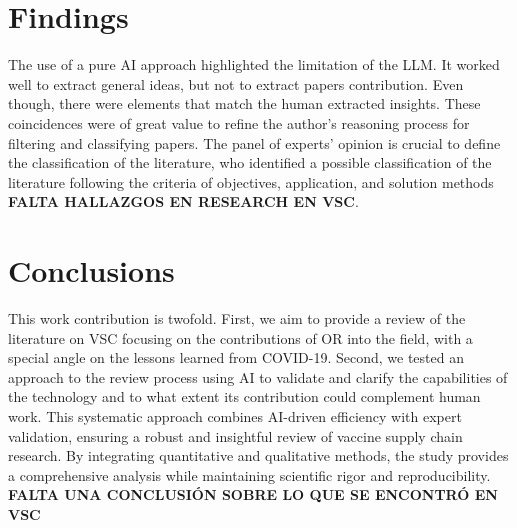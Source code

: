 \documentclass{optica-article}
\begin{document}
\section{Findings}

The use of a pure AI approach highlighted the limitation of the LLM. It worked well to extract general ideas, but not to extract papers contribution. Even though, there were elements that match the human extracted insights. These coincidences were of great value to refine the author's reasoning process for filtering and classifying papers. The panel of experts’ opinion is crucial to define the classification of the literature, who identified a possible classification of the literature following the criteria of objectives, application, and solution methods \textbf{FALTA HALLAZGOS EN RESEARCH EN VSC}.

\section{Conclusions}

This work contribution is twofold. First, we aim to provide a review of the literature on VSC focusing on the contributions of OR into the field, with a special angle on the lessons learned from COVID-19. Second, we tested an approach to the review process using AI to validate and clarify the capabilities of the technology and to what extent its contribution could complement human work. This systematic approach combines AI-driven efficiency with expert validation, ensuring a robust and insightful review of vaccine supply chain research. By integrating quantitative and qualitative methods, the study provides a comprehensive analysis while maintaining scientific rigor and reproducibility. \textbf{FALTA UNA CONCLUSIÓN SOBRE LO QUE SE ENCONTRÓ EN VSC}







\end{document}
